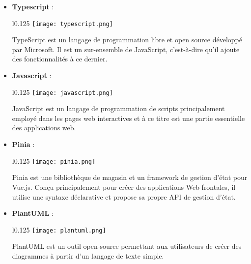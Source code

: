 \begin{itemize}
    \item \textbf{Typescript} :\\
    \begin{minipage}{\linewidth}
      \begin{wrapfigure}{l}{0.125\textwidth}
        \vspace{-0.5cm}
        \texttt{[image: typescript.png]} 
      \end{wrapfigure}
      TypeScript est un langage de programmation libre et open source développé par Microsoft. Il est un sur-ensemble de JavaScript, c'est-à-dire qu'il ajoute des fonctionnalités à ce dernier.
    \end{minipage}
  
    \vspace{0.5cm}
  
    \item \textbf{Javascript} :\\
    \begin{minipage}{\linewidth}
      \begin{wrapfigure}{l}{0.125\textwidth}
        \vspace{-0.5cm}
        \texttt{[image: javascript.png]} 
      \end{wrapfigure}
      JavaScript est un langage de programmation de scripts principalement employé dans les pages web interactives et à ce titre est une partie essentielle des applications web.
    \end{minipage}

    \vspace{0.5cm}
  
    \item \textbf{Pinia} :\\
    \begin{minipage}{\linewidth}
      \begin{wrapfigure}{l}{0.125\textwidth}
        \vspace{-0.5cm}
        \texttt{[image: pinia.png]} 
      \end{wrapfigure}
      Pinia est une bibliothèque de magasin et un framework de gestion d'état pour Vue.js. Conçu principalement pour créer des applications Web frontales, il utilise une syntaxe déclarative et propose sa propre API de gestion d'état.
    \end{minipage}
    
    \vspace{0.5cm}
  
    \item \textbf{PlantUML} :\\
    \begin{minipage}{\linewidth}
      \begin{wrapfigure}{l}{0.125\textwidth}
        \vspace{-0.5cm}
        \texttt{[image: plantuml.png]} 
      \end{wrapfigure}
      PlantUML est un outil open-source permettant aux utilisateurs de créer des diagrammes à partir d'un langage de texte simple.
    \end{minipage}


\end{itemize}
